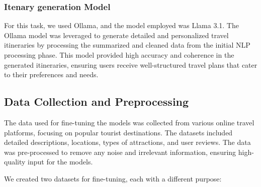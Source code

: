 \documentclass[conference]{IEEEtran}
\begin{document}
         \subsubsection{Itenary generation Model}
         For this task, we used Ollama, and the model employed was Llama 3.1. The Ollama model was leveraged to generate detailed and personalized travel itineraries by processing the summarized and cleaned data from the initial NLP processing phase. This model provided high accuracy and coherence in the generated itineraries, ensuring users receive well-structured travel plans that cater to their preferences and needs.


\subsection{Data Collection and Preprocessing}

The data used for fine-tuning the models was collected from various online travel platforms, focusing on popular tourist destinations. The datasets included detailed descriptions, locations, types of attractions, and user reviews. The data was pre-processed to remove any noise and irrelevant information, ensuring high-quality input for the models.

We created two datasets for fine-tuning, each with a different purpose:
\end{document}
